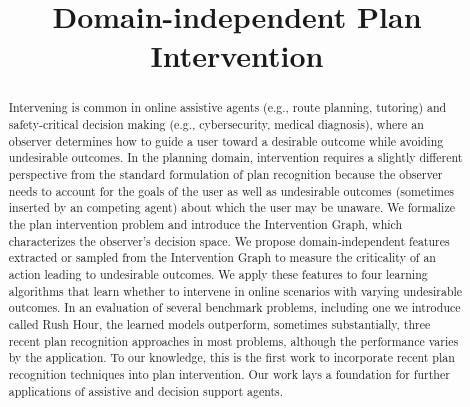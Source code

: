 \documentclass[letterpaper]{article}
\theoremstyle{plain}
\begin{document}
\title{Domain-independent Plan Intervention}
\newcommand{\debug}[2]{[\textbf{DEBUG #1}: \textcolor{WildStrawberry}{\textit{#2}}]}
\nocopyright
\maketitle
\begin{abstract}
Intervening is common in online assistive agents (e.g., route planning, tutoring) and safety-critical decision making (e.g., cybersecurity, medical diagnosis), where an observer determines how to guide a user toward a desirable outcome while avoiding undesirable outcomes.
In the planning domain, intervention requires a slightly different perspective from the standard formulation of plan recognition because the observer needs to account for the goals of the user as well as undesirable outcomes (sometimes inserted by an competing agent) about which the user may be unaware.
We formalize the plan intervention problem and introduce the Intervention Graph, which characterizes the observer's decision space.
We propose domain-independent features extracted or sampled from the Intervention Graph to measure the criticality of an action leading to undesirable outcomes.
We apply these features to four learning algorithms that learn whether to intervene in online scenarios with varying undesirable outcomes.
In an evaluation of several benchmark problems, including one we introduce called Rush Hour,
the learned models outperform, sometimes substantially, three recent plan recognition approaches in most problems, although the performance varies by the application.
To our knowledge, this is the first work to incorporate recent plan recognition techniques into plan intervention.
Our work lays a foundation for further applications of assistive and decision support agents.
\end{abstract}
\end{document}

